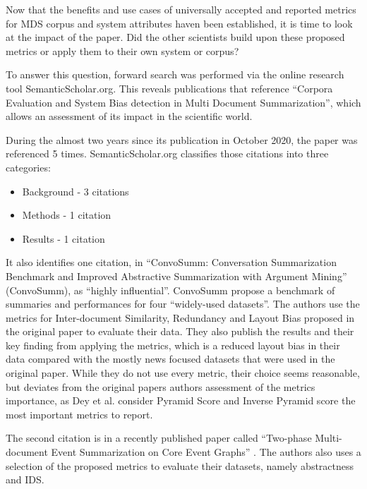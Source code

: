 \documentclass[20_original-paper.tex]{subfiles}
\begin{document}
Now that the benefits and use cases of universally accepted and reported metrics for MDS corpus and system attributes haven been established, it is time to look at the impact of the paper. Did the other scientists build upon these proposed metrics or apply them to their own system or corpus?

To answer this question, forward search was performed via the online research tool SemanticScholar.org.
This reveals publications that reference \enquote{Corpora Evaluation and System Bias detection in Multi Document Summarization}, which allows an assessment of its impact in the scientific world.

During the almost two years since its publication in October 2020, the paper was referenced 5 times. SemanticScholar.org classifies those citations into three categories: \cite{Cohan2019StructuralSF}

\begin{itemize}
    \item Background - 3 citations
    \item Methods - 1 citation
    \item Results - 1 citation
\end{itemize}

It also identifies one citation, in \enquote{ConvoSumm: Conversation Summarization Benchmark and Improved Abstractive Summarization with Argument Mining} (ConvoSumm)\cite{Fabbri2021ConvoSummCS},
as \enquote{highly influential}\cite{Valenzuela2015IdentifyingMC}.
ConvoSumm propose a benchmark of summaries and performances for four \enquote{widely-used datasets}.
The authors use the metrics for Inter-document Similarity, Redundancy and Layout Bias proposed in the original paper to evaluate their data.
They also publish the results and their key finding from applying the metrics, which is a reduced layout bias in their data compared with the mostly news focused datasets that were used in the original paper.
While they do not use every metric, their choice seems reasonable, but deviates from the original papers authors assessment of the metrics importance, as
Dey et al. consider Pyramid Score and Inverse Pyramid score the most important metrics to report.\cite{dey-etal-2020-corpora}

The second citation is in a recently published paper called \enquote{Two-phase Multi-document Event Summarization on Core Event Graphs} \cite{Chen2022TwophaseME}. The authors also uses a selection of the proposed metrics to evaluate their datasets, namely abstractness and IDS.
\end{document}
